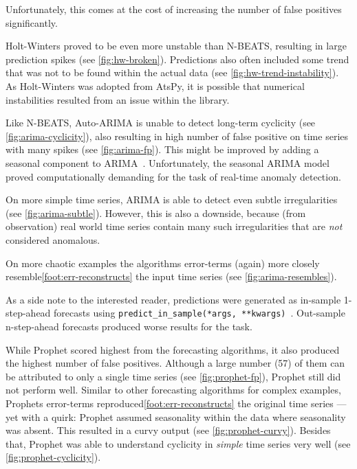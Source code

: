 \begin{description}[style=unboxed,leftmargin=0cm]
    Unfortunately, this comes at the cost of increasing the number of false positives
    significantly.
    \item[Holt-Winters] Holt-Winters proved to be even more unstable than N-BEATS,
    resulting in large prediction spikes (see \cref{fig:hw-broken}). Predictions also
    often included some trend that was not to be found within the actual data (see
    \cref{fig:hw-trend-instability}). As Holt-Winters was adopted from AtsPy,
    it is possible that numerical instabilities resulted from an issue within the library.
    \item[Auto-ARIMA] Like N-BEATS\@, Auto-ARIMA is unable to detect long-term
    cyclicity (see \cref{fig:arima-cyclicity}), also resulting in high number of
    false positive on time series with many spikes (see \cref{fig:arima-fp}).
    This might be improved by adding a seasonal component to ARIMA~\cite[cf.][]{Box.2016}.
    Unfortunately, the seasonal ARIMA model proved computationally demanding for
    the task of real-time anomaly detection.

    On more simple time series, ARIMA is able to detect even subtle irregularities
    (see \cref{fig:arima-subtle}). However, this is also a downside, because
    (from observation) real world time series contain many such irregularities
    that are \textit{not} considered anomalous.
    
    On more chaotic examples the algorithms error-terms (again) more closely
    resemble\cref{foot:err-reconstructs} the input time series (see \cref{fig:arima-resembles}).
    
    As a side note to the interested reader, predictions were generated as in-sample
    1-step-ahead forecasts using \mbox{\texttt{predict\_in\_sample(*args, **kwargs)}~\cite{Smith.2017}}.
    Out-sample n-step-ahead forecasts produced worse results for the task.
    \item[Prophet] While Prophet scored highest from the forecasting algorithms,
    it also produced the highest number of false positives. Although a large number
    (57) of them can be attributed to only a single time series (see \cref{fig:prophet-fp}),
    Prophet still did not perform well. Similar to other forecasting algorithms
    for complex examples, Prophets error-terms reproduced\cref{foot:err-reconstructs}
    the original time series --- yet with a quirk: Prophet assumed seasonality within
    the data where seasonality was absent. This resulted in a curvy output
    (see \cref{fig:prophet-curvy}). Besides that, Prophet was able to understand
    cyclicity in \textit{simple} time series very well (see \cref{fig:prophet-cyclicity}).
\end{description}
